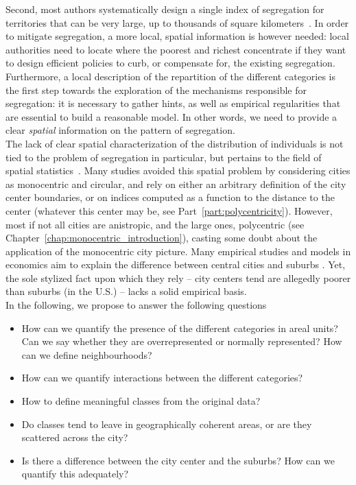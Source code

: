 Second, most authors systematically design a single index of segregation for
territories that can be very large, up to thousands of square
kilometers~\cite{Apparicio:2000}. In order to mitigate segregation, a more
local, spatial information is however needed: local authorities need to locate
where the poorest and richest concentrate if they want to design efficient
policies to curb, or compensate for, the existing segregation. Furthermore, 
a local description of the repartition of the different categories is the first
step towards the exploration of the mechanisms responsible for segregation: it
is necessary to gather hints, as well as empirical regularities that are
essential to build a reasonable model. 
In other words, we need to provide a clear {\it spatial} information on the
pattern of segregation.\\



The lack of clear spatial characterization of the distribution of individuals is
not tied to the problem of segregation in particular, but pertains to the field
of spatial statistics~\cite{Ripley:1981}. Many studies avoided this spatial
problem by considering cities as monocentric and circular, and rely on either an
arbitrary definition of the city center boundaries, or on indices computed as a
function to the distance to the center (whatever this center may be, see
Part~\ref{part:polycentricity}). However, most if
not all cities are anistropic, and the large ones, polycentric
(see Chapter~\ref{chap:monocentric_introduction}), casting some doubt about
the application of the monocentric city picture. Many empirical studies and
models in economics aim to explain the difference between central cities and
suburbs \cite{Glaeser:2008, Brueckner:1999}. Yet, the sole stylized fact upon
which they rely -- city centers tend are allegedly poorer than suburbs (in the U.S.) --
lacks a solid empirical basis.\\

In the following, we propose to answer the following questions

\begin{itemize}
    \item How can we quantify the presence of the different categories in areal
        units? Can we say whether they are overrepresented or normally
        represented? How can we define neighbourhoods?
    \item How can we quantify interactions between the different categories?
    \item How to define meaningful classes from the original data?
    \item Do classes tend to leave in geographically coherent areas, or are they
        scattered across the city?
    \item Is there a difference between the city center and the suburbs? How
        can we quantify this adequately?
\end{itemize}


